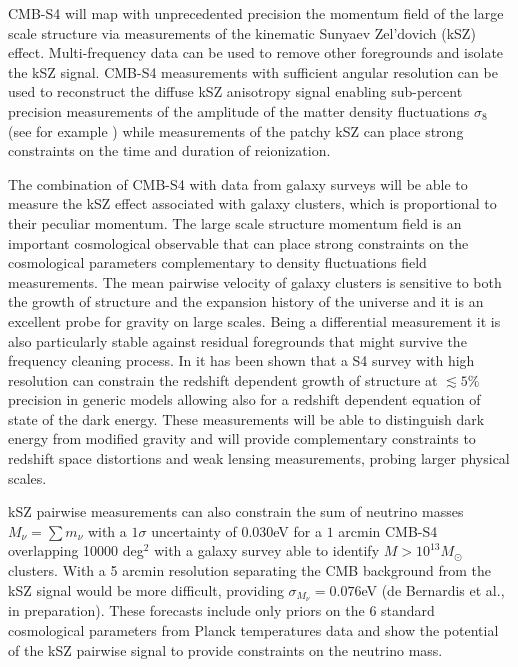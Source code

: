 CMB-S4 will map with unprecedented precision the momentum field of the large scale structure via measurements of the kinematic Sunyaev Zel'dovich (kSZ) effect. Multi-frequency data can be used to remove other foregrounds and isolate the kSZ signal. CMB-S4 measurements with sufficient angular resolution can be used to reconstruct the diffuse kSZ anisotropy signal enabling sub-percent precision measurements of the amplitude of the matter density fluctuations $\sigma_8$ (see for example \cite{Calabrese:2014gwa}) while measurements of the patchy kSZ can place strong constraints on the time and duration of reionization.

The combination of CMB-S4 with data from galaxy surveys will be able to measure the kSZ effect associated with galaxy clusters, which is proportional to their peculiar momentum. The large scale structure momentum field is an important cosmological observable that can place strong constraints on the cosmological parameters \cite{Bhattacharya:2007sk,Kosowsky:2009nc,Mueller:2014nsa,Mueller:2014dba} complementary to density fluctuations field measurements. The mean pairwise velocity of galaxy clusters is sensitive to both the growth of structure and the expansion history of the universe and it is an excellent probe for gravity on large scales. Being a differential measurement it is also particularly stable against residual foregrounds that might survive the frequency cleaning process. In \cite{Mueller:2014nsa,Mueller:2014dba} it has been shown that a S4 survey with high resolution can constrain the redshift dependent growth of structure at $\lesssim 5\%$ precision in generic models allowing also for a redshift dependent equation of state of the dark energy. These measurements will be able to distinguish dark energy from modified gravity and will provide complementary constraints to redshift space distortions and weak lensing measurements, probing larger physical scales.

kSZ pairwise measurements can also constrain the sum of neutrino masses $M_{\nu}= \sum m_{\nu}$ with a $1\sigma$ uncertainty of $0.030$eV for a $1$ arcmin CMB-S4 overlapping 10000 deg$^2$ with a galaxy survey able to identify $M>10^{13}M_{\odot}$ clusters. With a 5 arcmin resolution separating the CMB background from the kSZ signal would be more difficult, providing  $\sigma_{M_{\nu}} = 0.076$eV (de Bernardis et al., in preparation). These forecasts include only priors on the 6 standard cosmological parameters from Planck temperatures data and show the potential of the kSZ pairwise signal to provide constraints on the neutrino mass. 

